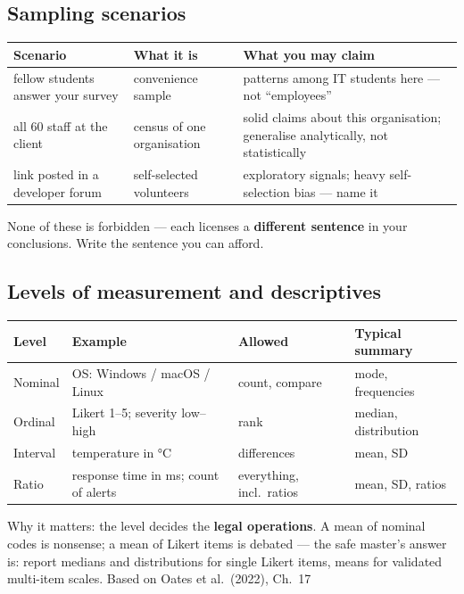 \documentclass[11pt,a4paper,british,twoside=false,headings=small,chapterprefix=false,numbers=noenddot]{scrbook}
\begin{document}
\subsection{Sampling scenarios}
\begin{center}\small
\footnotesize
  \renewcommand{\arraystretch}{1.35}
  \begin{tabular}{@{}p{4.2cm}p{4.4cm}p{4.4cm}@{}}
    \toprule
    \textbf{Scenario} & \textbf{What it is} & \textbf{What you may claim}\\
    \midrule
    fellow students answer your survey & convenience sample & patterns among IT students here --- not ``employees''\\
    all 60 staff at the client & census of one organisation & solid claims about this organisation; generalise analytically, not statistically\\
    link posted in a developer forum & self-selected volunteers & exploratory signals; heavy self-selection bias --- name it\\
    \bottomrule
  \end{tabular}
  

  None of these is forbidden --- each licenses a \textbf{different
  sentence} in your conclusions. Write the sentence you can afford.
\end{center}


\subsection{Levels of measurement and descriptives}
\begin{center}\small
\small
  \renewcommand{\arraystretch}{1.35}
  \begin{tabular}{@{}p{2.1cm}p{4.5cm}p{3.1cm}p{2.9cm}@{}}
    \toprule
    \textbf{Level} & \textbf{Example} & \textbf{Allowed} & \textbf{Typical summary}\\
    \midrule
    Nominal & OS: Windows / macOS / Linux & count, compare & mode, frequencies\\
    Ordinal & Likert 1--5; severity low--high & rank & median, distribution\\
    Interval & temperature in °C & differences & mean, SD\\
    Ratio & response time in ms; count of alerts & everything, incl.\ ratios & mean, SD, ratios\\
    \bottomrule
  \end{tabular}
  

  Why it matters: the level decides the \textbf{legal operations}. A mean of
  nominal codes is nonsense; a mean of Likert items is debated --- the safe
  master's answer is: report medians and distributions for single Likert
  items, means for validated multi-item scales.
  \hfill {\color{kgrey}\small Based on Oates et al.\ (2022), Ch.\ 17}
\end{center}
\end{document}
